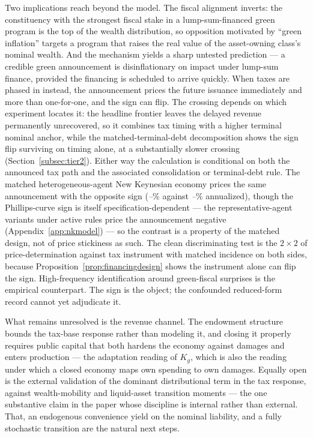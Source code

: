 \documentclass[12pt]{article}
\providecommand{\pendingnum}{\textit{--}}
\providecommand{\matchedNKimpact}{\pendingnum}
\providecommand{\matchedDTPLimpact}{\pendingnum}
\begin{document}
Two implications reach beyond the model. The fiscal alignment inverts:
the constituency with the strongest fiscal stake in a lump-sum-financed
green program is the top of the wealth distribution, so opposition motivated
by ``green inflation'' targets a program that raises the real value of the
asset-owning class's nominal wealth. And the mechanism yields a sharp
untested prediction --- a credible green announcement is disinflationary on
impact under lump-sum finance, provided the financing is scheduled to
arrive quickly. When taxes are phased in instead, the announcement prices
the future issuance immediately and more than one-for-one, and the sign can
flip. The crossing depends on which experiment locates it: the headline
frontier leaves the delayed revenue permanently unrecovered, so it combines
tax timing with a higher terminal nominal anchor, while the
matched-terminal-debt decomposition shows the sign flip surviving on timing
alone, at a substantially slower crossing
(Section~\ref{subsec:tier2}). Either way the calculation is conditional on
both the announced tax path and the associated consolidation or
terminal-debt rule. The matched
heterogeneous-agent New
Keynesian economy prices the same announcement with the opposite sign
(\matchedNKimpact\% against \matchedDTPLimpact\% annualized), though the
Phillips-curve sign is itself specification-dependent --- the
representative-agent variants under active rules price the announcement
negative (Appendix~\ref{app:nkmodel}) --- so the contrast is a property of
the matched design, not of price stickiness as such. The clean
discriminating test is the $2\times2$ of price-determination against tax
instrument with matched incidence on both sides, because
Proposition~\ref{prop:financingdesign} shows the instrument alone can flip
the sign. High-frequency identification around green-fiscal surprises is the
empirical counterpart. The sign is the object; the confounded reduced-form
record cannot yet adjudicate it.

What remains unresolved is the revenue channel. The endowment structure
bounds the tax-base response rather than modeling it, and closing it
properly requires public capital that both hardens the economy against
damages and enters production --- the adaptation reading of $K_g$, which is
also the reading under which a closed economy maps own spending to own
damages. Equally open is the external validation of the dominant
distributional term in the tax response, against wealth-mobility and
liquid-asset transition moments --- the one substantive claim in the paper
whose discipline is internal rather than external. That, an endogenous
convenience yield on the nominal liability, and a fully stochastic
transition are the natural next steps.
\end{document}
